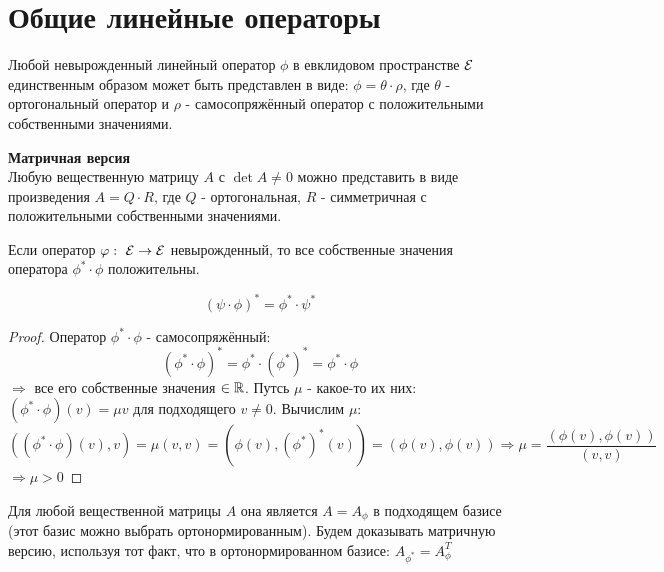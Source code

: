 \section{Общие линейные операторы}
\begin{theorem}
    Любой невырожденный линейный оператор $\phi$ в евклидовом пространстве $\mathcal{E}$ единственным образом может быть представлен в виде: $\phi = \theta \cdot \rho$, где $\theta$ - ортогональный оператор и $\rho$ - самосопряжённый оператор с положительными собственными значениями. 
\end{theorem}
\begin{theorem} \textbf{Матричная версия}\\
    Любую вещественную матрицу $A$ с $\det A \neq 0$ можно представить в виде произведения $A = Q \cdot R$, где $Q$ - ортогональная, $R$ - симметричная с положительными собственными значениями.      
\end{theorem}
\begin{lemma}
    Если оператор $\varphi: \ \mathcal{E} \to \mathcal{E}$ невырожденный, то все собственные значения оператора $\phi^* \cdot \phi$ положительны.  
\end{lemma} 
\begin{subtheorem}
    $$(\psi \cdot \phi)^* = \phi^* \cdot \psi^*$$ 
\end{subtheorem} 
\begin{proof}
    Оператор $\phi^* \cdot \phi$ - самосопряжённый: 
    $$(\phi^* \cdot \phi)^* = \phi^* \cdot (\phi^*)^* = \phi^* \cdot \phi$$
    $\Longrightarrow $ все его собственные значения $\in \mathbb{R}$. Путсь $\mu$ - какое-то их них: $(\phi^* \cdot \phi)(v) = \mu v$ для подходящего $v \neq 0$. Вычислим $\mu$: 
    $$((\phi^* \cdot \phi)(v),v) = \mu(v,v) = (\phi(v),(\phi^*)^*(v)) = (\phi(v), \phi(v)) \Longrightarrow \mu = \frac{(\phi(v),\phi(v))}{(v,v)}$$
    $\Longrightarrow \mu>0$     
\end{proof} 
\begin{remark}
    Для любой вещественной матрицы $A$ она является $A = A_\phi$ в подходящем базисе (этот базис можно выбрать ортонормированным). Будем доказывать матричную версию, используя тот факт, что в ортонормированном базисе: $A_{\phi^*} = A_\phi^T$  
\end{remark}
